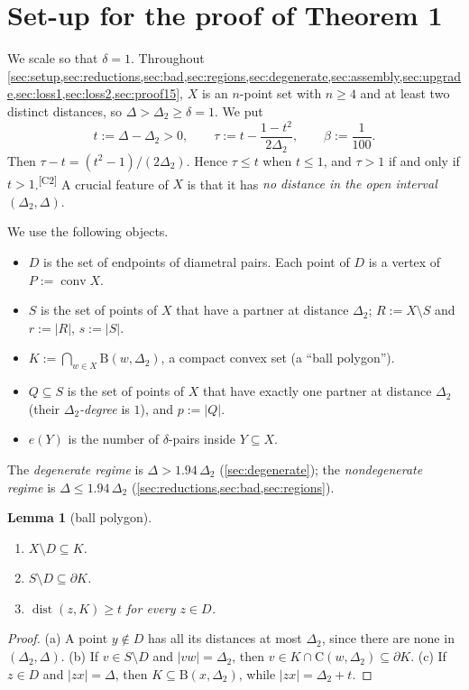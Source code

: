 \documentclass[11pt]{amsart}
\newtheorem{lemma}[theorem]{Lemma}
\theoremstyle{definition}
\theoremstyle{remark}
\newcommand{\Dt}{\Delta_2}
\newcommand{\conv}{\operatorname{conv}}
\newcommand{\dist}{\operatorname{dist}}
\newcommand{\Cc}{\mathrm{C}}      %
\newcommand{\Dd}{\mathrm{B}}      %
\newcommand{\chk}[1]{\textsuperscript{[#1]}}
\begin{document}
\section{Set-up for the proof of Theorem 1}\label{sec:setup}

We scale so that $\delta=1$. Throughout \cref{sec:setup,sec:reductions,sec:bad,sec:regions,sec:degenerate,sec:assembly,sec:upgrade,sec:loss1,sec:loss2,sec:proof15}, $X$ is an $n$-point set with $n\ge 4$ and at least two distinct distances, so $\Delta>\Dt\ge\delta=1$. We put
\[
t:=\Delta-\Dt>0,\qquad \tau:=t-\frac{1-t^2}{2\Dt},\qquad \beta:=\frac1{100}.
\]
Then $\tau-t=(t^2-1)/(2\Dt)$. Hence $\tau\le t$ when $t\le 1$, and $\tau>1$ if and only if $t>1$.\chk{C2} A crucial feature of $X$ is that it has \emph{no distance in the open interval $(\Dt,\Delta)$}.

We use the following objects.
\begin{itemize}[leftmargin=2em]
\item $D$ is the set of endpoints of diametral pairs. Each point of $D$ is a vertex of $P:=\conv X$.
\item $S$ is the set of points of $X$ that have a partner at distance $\Dt$; $R:=X\setminus S$ and $r:=|R|$, $s:=|S|$.
\item $K:=\bigcap_{w\in X}\Dd(w,\Dt)$, a compact convex set (a ``ball polygon'').
\item $Q\subseteq S$ is the set of points of $X$ that have exactly one partner at distance $\Dt$ (their \emph{$\Dt$-degree} is $1$), and $p:=|Q|$.
\item $e(Y)$ is the number of $\delta$-pairs inside $Y\subseteq X$.
\end{itemize}
The \emph{degenerate regime} is $\Delta>1.94\,\Dt$ (\cref{sec:degenerate}); the \emph{nondegenerate regime} is $\Delta\le 1.94\,\Dt$ (\cref{sec:reductions,sec:bad,sec:regions}).

\begin{lemma}[ball polygon]\label{lem:ballpoly}
\begin{enumerate}[label=(\alph*)]
\item $X\setminus D\subseteq K$.
\item $S\setminus D\subseteq\partial K$.
\item $\dist(z,K)\ge t$ for every $z\in D$.
\end{enumerate}
\end{lemma}
\begin{proof}
(a) A point $y\notin D$ has all its distances at most $\Dt$, since there are none in $(\Dt,\Delta)$. (b) If $v\in S\setminus D$ and $|vw|=\Dt$, then $v\in K\cap \Cc(w,\Dt)\subseteq\partial K$. (c) If $z\in D$ and $|zx|=\Delta$, then $K\subseteq\Dd(x,\Dt)$, while $|zx|=\Dt+t$.
\end{proof}
\end{document}
